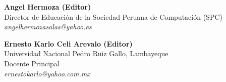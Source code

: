 \begin{center}
\textbf{Angel Hermoza (Editor)}\\
Director de Educación de la Sociedad Peruana de Computación (SPC)\\
\textit{angelhermozasalas@yahoo.es}
\end{center}

\begin{center}
\textbf{Ernesto Karlo Celi Arevalo (Editor)}\\
Universidad Nacional Pedro Ruiz Gallo, Lambayeque\\
Docente Principal\\
\textit{ernestokarlo@yahoo.com.mx}
\end{center}

